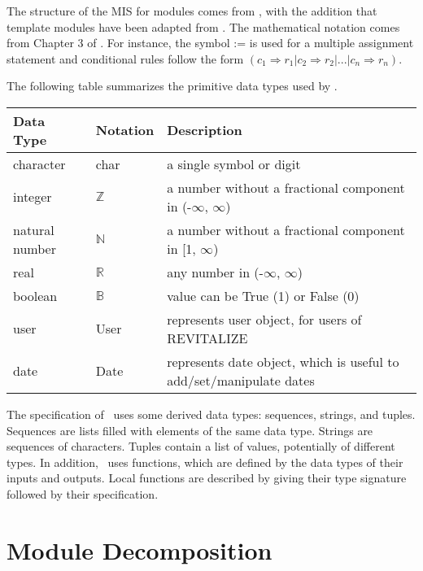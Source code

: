 \documentclass[12pt, titlepage]{article}
\begin{document}
The structure of the MIS for modules comes from \citet{HoffmanAndStrooper1995},
with the addition that template modules have been adapted from
\cite{GhezziEtAl2003}.  The mathematical notation comes from Chapter 3 of
\citet{HoffmanAndStrooper1995}.  For instance, the symbol := is used for a
multiple assignment statement and conditional rules follow the form $(c_1
\Rightarrow r_1 | c_2 \Rightarrow r_2 | ... | c_n \Rightarrow r_n )$.

The following table summarizes the primitive data types used by \progname. 

\begin{center}
	\renewcommand{\arraystretch}{1.2}
	\noindent 
	\begin{tabular}{l l p{7.5cm}} 
		\toprule 
		\textbf{Data Type} & \textbf{Notation} & \textbf{Description}\\ 
		\midrule
		character & char & a single symbol or digit\\
		integer & $\mathbb{Z}$ & a number without a fractional component in (-$\infty$, $\infty$) \\
		natural number & $\mathbb{N}$ & a number without a fractional component in [1, $\infty$) \\
		real & $\mathbb{R}$ & any number in (-$\infty$, $\infty$)\\
		boolean & $\mathbb{B}$ & value can be True (1) or False (0)\\
		user & User & represents user object, for users of REVITALIZE\\
		date & Date & represents date object, which is useful to add/set/manipulate dates\\
		\bottomrule
	\end{tabular} 
\end{center}

\noindent
The specification of \progname \ uses some derived data types: sequences, strings, and
tuples. Sequences are lists filled with elements of the same data type. Strings
are sequences of characters. Tuples contain a list of values, potentially of
different types. In addition, \progname \ uses functions, which
are defined by the data types of their inputs and outputs. Local functions are
described by giving their type signature followed by their specification.

\section{Module Decomposition}
\end{document}
